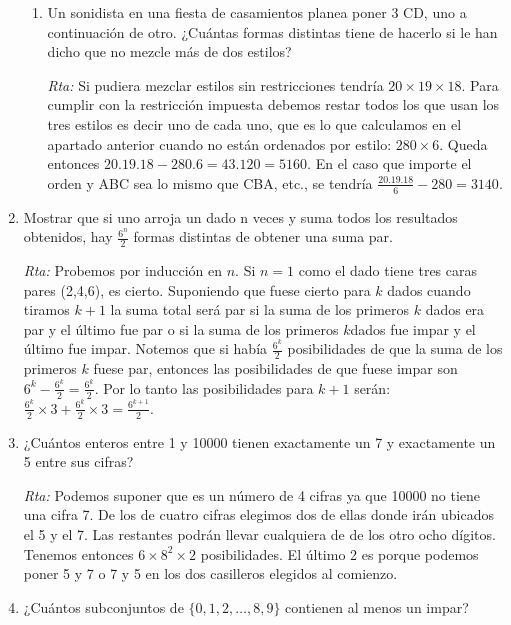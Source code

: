 \documentclass[a4paper,12pt,twoside,spanish,reqno]{amsbook}
\numberwithin{equation}{section}
\begin{document}
\begin{enumerate}
\begin{enumerate}
\item Un sonidista en una fiesta de casamientos planea poner 3 CD, uno a continuación
de otro. ¿Cuántas formas distintas tiene de hacerlo si le han dicho que no
mezcle más de dos estilos?

\noindent\textit{Rta:} Si pudiera mezclar estilos  sin restricciones tendría  $20\times 19\times 18$. Para cumplir con la restricción impuesta debemos restar todos los que usan los tres estilos es decir uno de cada uno, que es lo que calculamos en el  apartado anterior cuando no están ordenados por estilo: $280\times 6$. Queda entonces $20.19.18-280.6=43.120=5160$. En el caso que importe el orden y ABC sea lo mismo que CBA, etc., se tendría $\frac{20.19.18}{6}-280=3140$.
\end{enumerate}

\medskip

\item Mostrar que si uno arroja un dado n veces y suma todos los resultados obtenidos,
hay $\frac{6^n}{2}$
formas distintas de obtener una suma par.

\noindent\textit{Rta:} Probemos por inducción en $n$. Si $n=1$ como el dado tiene tres caras pares (2,4,6), es cierto.
Suponiendo que fuese cierto para $k$ dados cuando tiramos $k+1$ la suma total será par si la suma de los primeros $k$ dados era par y el último fue par o si la suma de los primeros $k$dados fue impar y el último fue impar. Notemos que si había $\frac{6^k}{2}$ posibilidades de que la suma de los primeros $k$ fuese par, entonces las posibilidades de que fuese impar son $6^k-\frac{6^k}{2}=\frac{6^k}{2}$. Por lo tanto las posibilidades para $k+1$ serán:${ \frac{6^k}{2}\times 3+\frac{6^k}{2}\times 3=\frac{6^{k+1}}{2}}$.

\medskip

\item ¿Cuántos enteros entre 1 y 10000 tienen exactamente un 7 y exactamente un 5
entre sus cifras?

\noindent\textit{Rta:} Podemos suponer que es un número de 4 cifras ya que 10000 no tiene una cifra 7.
De los de cuatro cifras elegimos dos de ellas donde irán ubicados el 5 y el 7. Las restantes podrán llevar cualquiera de de los otro ocho dígitos. Tenemos entonces $6\times 8^2\times 2$ posibilidades. El último 2 es porque podemos poner 5 y 7 o 7 y 5 en los dos casilleros elegidos al comienzo.

\medskip

\item ¿Cuántos subconjuntos de $\{0,1,2,\dots,8,9\}$ contienen al menos un impar?


\end{enumerate}
\end{document}

